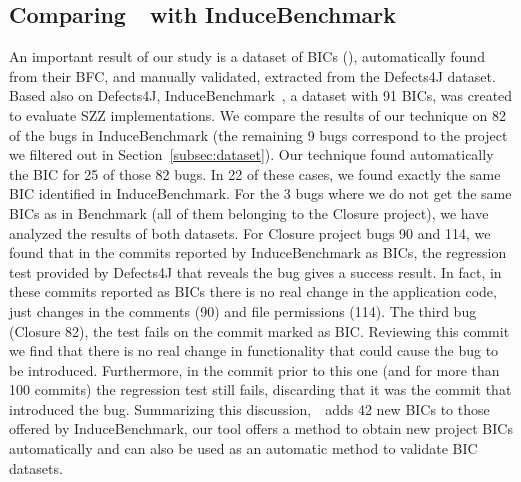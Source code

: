 \subsection{Comparing~\datasetName~with InduceBenchmark}
\label{sec:induce-benchmark}
An important result of our study is a dataset of BICs (\datasetName), automatically found from their BFC, and manually validated, extracted from the Defects4J dataset. Based also on Defects4J, InduceBenchmark~\cite{wen2019exploring}, a dataset with 91 BICs, was created to evaluate SZZ implementations. 
We compare the results of our technique on 82 of the bugs in InduceBenchmark (the remaining 9 bugs correspond to the project we filtered out in Section~\ref{subsec:dataset}). 
Our technique found automatically the BIC for 25 of those 82 bugs. In 22 of these cases, we found exactly the same BIC identified in InduceBenchmark.
For the 3 bugs where we do not get the same BICs as in Benchmark (all of them belonging to the Closure project), we have analyzed the results of both datasets.
For Closure project bugs 90 and 114, we found that in the commits reported by InduceBenchmark as BICs, the regression test provided by Defects4J that reveals the bug gives a success result. In fact, in these commits reported as BICs there is no real change in the application code, just changes in the comments (90) and file permissions (114).
The third bug (Closure 82), the test fails on the commit marked as BIC. Reviewing this commit we find that there is no real change in functionality that could cause the bug to be introduced. Furthermore, in the commit prior to this one (and for more than 100 commits) the regression test still fails, discarding that it was the commit that introduced the bug. 
Summarizing this discussion,~\datasetName~adds 42 new BICs to those offered by InduceBenchmark, our tool offers a method to obtain new project BICs automatically and can also be used as an automatic method to validate BIC datasets.


